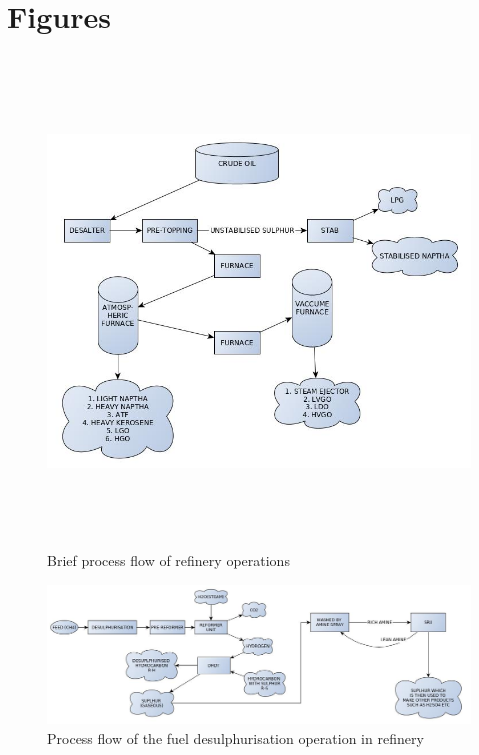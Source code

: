 \documentclass{report}
\begin{document}
	\section{Figures}
	\begin{figure}[h]
		\centering
		\includegraphics[width=\linewidth,height=13cm]{refinery_flow}
		\caption{Brief process flow of refinery operations}
		\label{refinery_flow}
	\end{figure}
	\begin{figure}[h]
		\centering
		\includegraphics[width=\linewidth]{sulphur_removal_flow}
		\caption{Process flow of the fuel desulphurisation operation in refinery}
		\label{sulphur_removal_flow}
	\end{figure}
\end{document}
